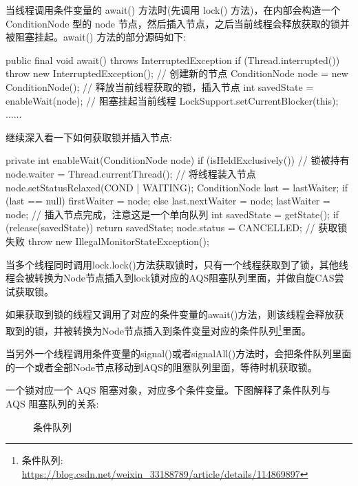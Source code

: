 当线程调用条件变量的 await() 方法时(先调用 lock() 方法)，在内部会构造一个 ConditionNode 型的 node 节点，然后插入节点，之后当前线程会释放获取的锁并被阻塞挂起。await() 方法的部分源码如下:

\begin{Java}
public final void await() throws InterruptedException {
    if (Thread.interrupted())
        throw new InterruptedException();
    // 创建新的节点
    ConditionNode node = new ConditionNode();
    // 释放当前线程获取的锁，插入节点
    int savedState = enableWait(node);
    // 阻塞挂起当前线程
    LockSupport.setCurrentBlocker(this);
    ......
}
\end{Java}

继续深入看一下如何获取锁并插入节点:

\begin{Java}
private int enableWait(ConditionNode node) {
    if (isHeldExclusively()) {  // 锁被持有
        node.waiter = Thread.currentThread();   // 将线程装入节点
        node.setStatusRelaxed(COND | WAITING);
        ConditionNode last = lastWaiter;
        if (last == null)
            firstWaiter = node;
        else
            last.nextWaiter = node;     
        lastWaiter = node;              // 插入节点完成，注意这是一个单向队列
        int savedState = getState();
        if (release(savedState))
            return savedState;
    }
    node.status = CANCELLED; // 获取锁失败
    throw new IllegalMonitorStateException();
}
\end{Java}

当多个线程同时调用lock.lock()方法获取锁时，只有一个线程获取到了锁，其他线程会被转换为Node节点插入到lock锁对应的AQS阻塞队列里面，并做自旋CAS尝试获取锁。

如果获取到锁的线程又调用了对应的条件变量的await()方法，则该线程会释放获取到的锁，并被转换为Node节点插入到条件变量对应的条件队列\footnote{条件队列: \url{https://blog.csdn.net/weixin_33188789/article/details/114869897}}里面。

当另外一个线程调用条件变量的signal()或者signalAll()方法时，会把条件队列里面的一个或者全部Node节点移动到AQS的阻塞队列里面，等待时机获取锁。

一个锁对应一个 AQS 阻塞对象，对应多个条件变量。下图解释了条件队列与 AQS 阻塞队列的关系:

\begin{figure}[H]
    \centering
    \small
    \caption{条件队列}
    \label{fig:条件队列}
\end{figure}

